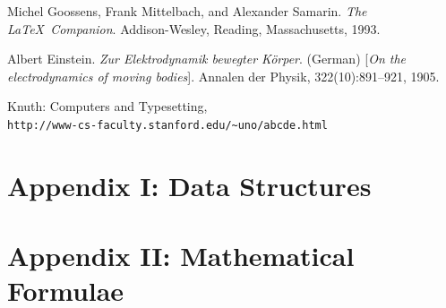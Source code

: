 \documentclass[]{book}
\renewcommand\cftchapafterpnum{\vskip 10pt}
\begin{document}
  \backmatter
  \setlength{\cftbeforechapskip}{15pt}
  \renewcommand\cftchapafterpnum{\vskip 10pt}
  \renewcommand\bibname{\large{References}}
  \begin{thebibliography}{9}
  Michel Goossens, Frank Mittelbach, and Alexander Samarin.
  \textit{The \LaTeX\ Companion}.
  Addison-Wesley, Reading, Massachusetts, 1993.

  Albert Einstein.
  \textit{Zur Elektrodynamik bewegter K{\"o}rper}. (German)
  [\textit{On the electrodynamics of moving bodies}].
  Annalen der Physik, 322(10):891–921, 1905.

  Knuth: Computers and Typesetting,
  \\\texttt{http://www-cs-faculty.stanford.edu/\~{}uno/abcde.html}
  \end{thebibliography}


  \appendix
  \chapter{\large{Appendix I: \textnormal{Data Structures}}}
  \chapter{\large{Appendix II: \textnormal{Mathematical Formulae}}}
  \printindex
\end{document}
